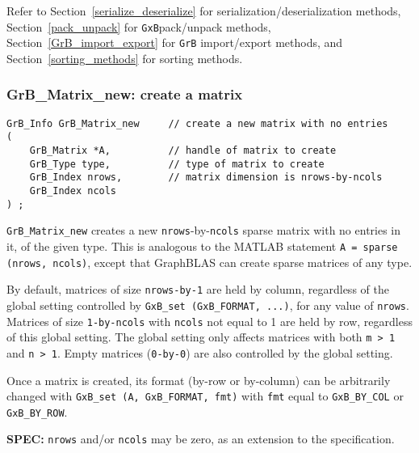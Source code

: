 \documentclass[12pt]{article}
\begin{document}
{\vspace{0.2in}
Refer to
Section~\ref{serialize_deserialize} for serialization/deserialization methods,
Section~\ref{pack_unpack} for \verb'GxB'pack/unpack methods,
Section~\ref{GrB_import_export} for \verb'GrB' import/export methods,
and
Section~\ref{sorting_methods} for sorting methods.

\subsubsection{{\sf GrB\_Matrix\_new:}          create a matrix}
\label{matrix_new}

\begin{mdframed}[userdefinedwidth=6in]
{\footnotesize
\begin{verbatim}
GrB_Info GrB_Matrix_new     // create a new matrix with no entries
(
    GrB_Matrix *A,          // handle of matrix to create
    GrB_Type type,          // type of matrix to create
    GrB_Index nrows,        // matrix dimension is nrows-by-ncols
    GrB_Index ncols
) ;
\end{verbatim} } \end{mdframed}

\verb'GrB_Matrix_new' creates a new \verb'nrows'-by-\verb'ncols' sparse matrix
with no entries in it, of the given type.  This is analogous to the MATLAB
statement \verb'A = sparse (nrows, ncols)', except that GraphBLAS can create
sparse matrices of any type.

By default, matrices of size \verb'nrows-by-1' are held by column, regardless
of the global setting controlled by \verb'GxB_set (GxB_FORMAT, ...)', for any
value of \verb'nrows'.  Matrices of size \verb'1-by-ncols' with \verb'ncols'
not equal to 1 are held by row, regardless of this global setting.  The global
setting only affects matrices with both \verb'm > 1' and \verb'n > 1'.  Empty
matrices (\verb'0-by-0') are also controlled by the global setting.

Once a matrix is created, its format (by-row or by-column) can be arbitrarily
changed with \verb'GxB_set (A, GxB_FORMAT, fmt)' with \verb'fmt' equal to
\verb'GxB_BY_COL' or \verb'GxB_BY_ROW'.

\begin{alert}
{\bf SPEC:} \verb'nrows' and/or \verb'ncols' may be zero,
as an extension to the specification.
\end{alert}

}
\end{document}
